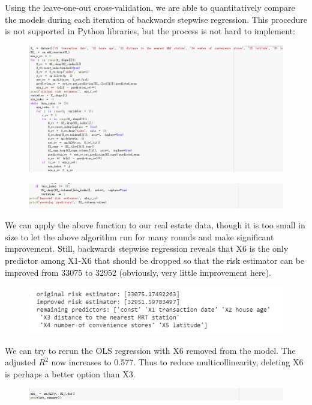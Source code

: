 \documentclass{article}
\begin{document}
Using the leave-one-out cross-validation, we are able to quantitatively compare the models during each iteration of backwards stepwise regression. This procedure is not supported in Python libraries, but the process is not hard to implement:
\begin{figure}[H]\centering\includegraphics[width=1.1\linewidth]{29.1}\end{figure}
\begin{figure}[H]\centering\includegraphics[width=1.1\linewidth]{29.2}\end{figure}
We can apply the above function to our real estate data, though it is too small in size to let the above algorithm run for many rounds and make significant improvement. Still, backwards stepwise regression reveals that X6 is the only predictor among X1-X6 that should be dropped so that the risk estimator can be improved from 33075 to 32952 (obviously, very little improvement here).
\begin{figure}[H]\includegraphics[width=0.8\linewidth]{30}\end{figure}
We can try to rerun the OLS regression with X6 removed from the model. The adjusted $R^2$ now increases to 0.577. Thus to reduce multicollinearity, deleting X6 is perhaps a better option than X3.
\begin{figure}[H]\includegraphics[width=1.1\linewidth]{31}\end{figure}
\end{document}

